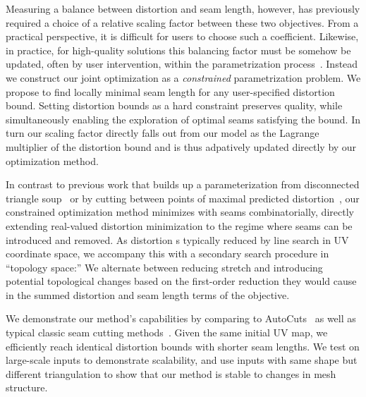 Measuring a balance between distortion and seam length, however, has previously required a choice of a relative scaling factor between these two objectives.  From a practical perspective, it is difficult for users to choose such a coefficient. %
Likewise, in practice, for high-quality solutions this balancing factor must be somehow be updated, often by user intervention, within the parametrization process\ \cite{Poranne2017Autocuts}. Instead we construct our joint optimization as a \emph{constrained} parametrization problem. We propose to find locally minimal seam length for any user-specified distortion bound. Setting distortion bounds as a hard constraint preserves quality, while simultaneously enabling the exploration of optimal seams satisfying the bound. In turn our scaling factor directly falls out from our model as the Lagrange multiplier of the distortion bound and is thus adpatively updated directly by our optimization method.

In contrast to previous work that builds up a parameterization from disconnected triangle soup~\cite{Poranne2017Autocuts} or by cutting between points of maximal predicted distortion~\cite{Gu2002Geometry,Sheffer2002Seamster}, our constrained optimization  method minimizes with seams combinatorially, directly extending real-valued distortion minimization to the regime where seams can be introduced and removed. As distortion s typically reduced by line search in UV coordinate space, we accompany this with a secondary search procedure in ``topology space:'' We alternate between reducing stretch and introducing potential topological changes based on the first-order reduction they would cause in the summed distortion and seam length terms of the objective. %


We demonstrate our method's capabilities by comparing to AutoCuts~\cite{Poranne2017Autocuts} as well as typical classic seam cutting methods~\cite{Gu2002Geometry,Sheffer2002Seamster}. %
Given the same initial UV map, we efficiently reach identical distortion bounds with shorter seam lengths. We test on large-scale inputs to demonstrate scalability, and use inputs with same shape but different triangulation to show that our method is stable to changes in mesh structure.

